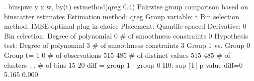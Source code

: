 . binspwc y x w, by(t) estmethod(qreg 0.4)
{\smallskip}
Pairwise group comparison based on binscatter estimates
Estimation method: qreg
Group variable: t
Bin selection method: IMSE-optimal plug-in choice
Placement: Quantile-spaced
Derivative: 0
Bin selection:                {\VBAR} 
         Degree of polynomial {\VBAR}       0
  \# of smoothness constraints {\VBAR}       0
Hypothesis test:              {\VBAR} 
         Degree of polynomial {\VBAR}       3
  \# of smoothness constraints {\VBAR}       3
{\smallskip}
Group 1 vs. Group 0
Group t=                      {\VBAR}      1   {\VBAR}     0
\# of observations             {\VBAR}     515  {\VBAR}     485
\# of distinct values          {\VBAR}     515  {\VBAR}     485
\# of clusters                 {\VBAR}       .  {\VBAR}       .
\# of bins                     {\VBAR}      15  {\VBAR}      20
{\smallskip}
diff = group 1 - group 0
H0:                {\VBAR} sup |T|           p value
diff=0             {\VBAR}   5.165             0.000
{\smallskip}
